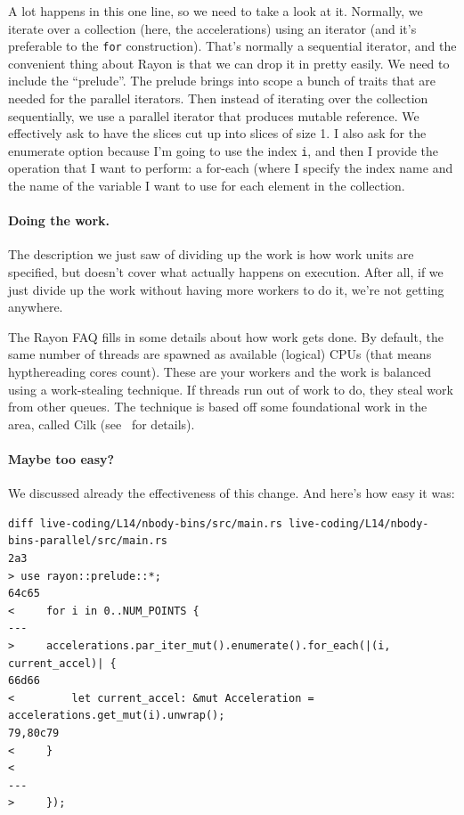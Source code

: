 \documentclass[a4paper]{report}
\begin{document}
\begin{appendices}
A lot happens in this one line, so we need to take a look at it. Normally, we iterate over a collection (here, the accelerations) using an iterator (and it's preferable to the \texttt{for} construction). That's normally a sequential iterator, and the convenient thing about Rayon is that we can drop it in pretty easily. We need to include the ``prelude''. The prelude brings into scope a bunch of traits that are needed for the parallel iterators. Then instead of iterating over the collection sequentially, we use a parallel iterator that produces mutable reference. We effectively ask to have the slices cut up into slices of size 1. I also ask for the enumerate option because I'm going to use the index \texttt{i}, and then I provide the operation that I want to perform: a for-each (where I specify the index name and the name of the variable I want to use for each element in the collection. 

\paragraph{Doing the work.} The description we just saw of dividing up the work is how work units are specified, but doesn't cover what actually happens on execution. After all, if we just divide up the work without having more workers to do it, we're not getting anywhere.

The Rayon FAQ fills in some details about how work gets done. By default, the same number of threads are spawned as available (logical) CPUs (that means hypthereading cores count). These are your workers and the work is balanced using a work-stealing technique. If threads run out of work to do, they steal work from other queues. The technique is based off some foundational work in the area, called Cilk (see~\cite{cilk} for details). 

\paragraph{Maybe too easy?}
We discussed already the effectiveness of this change. And here's how easy it was:

{\scriptsize 
\begin{verbatim}
diff live-coding/L14/nbody-bins/src/main.rs live-coding/L14/nbody-bins-parallel/src/main.rs
2a3
> use rayon::prelude::*;
64c65
<     for i in 0..NUM_POINTS {
---
>     accelerations.par_iter_mut().enumerate().for_each(|(i, current_accel)| {
66d66
<         let current_accel: &mut Acceleration = accelerations.get_mut(i).unwrap();
79,80c79
<     }
< 
---
>     });
\end{verbatim}
}


\end{appendices}
\end{document}
